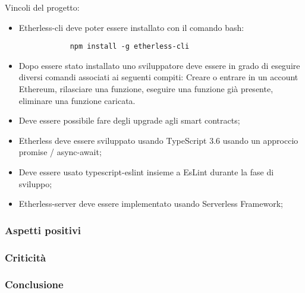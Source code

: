     Vincoli del progetto:
    \begin{itemize}
    		\item Etherless-cli deve poter essere installato con il comando bash:  \begin{verbatim}
    		npm install -g etherless-cli
    		\end{verbatim}
    		\item Dopo essere stato installato uno sviluppatore deve essere in grado di eseguire diversi comandi associati ai seguenti compiti: Creare o entrare in un account Ethereum, rilasciare una funzione, eseguire una funzione già presente, eliminare una funzione caricata.
    		\item Deve essere possibile fare degli upgrade agli smart contracts;
    		\item Etherless deve essere sviluppato usando TypeScript 3.6 usando un approccio  promise / async-await;
    		\item Deve essere usato typescript-eslint insieme a EsLint durante la fase di sviluppo;
    		\item Etherless-server deve essere implementato usando Serverless Framework;
    						
 \end{itemize}
    
    
    \subsubsection{Aspetti positivi}
    
    \subsubsection{Criticità}
    
    \subsubsection{Conclusione}
